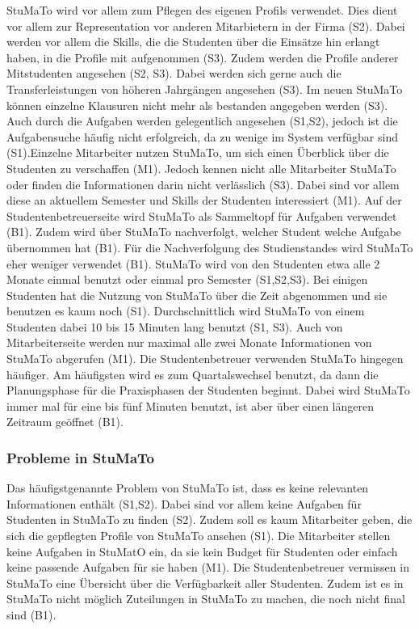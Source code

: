 \documentclass[
  12pt,
  ngerman,
  a4paper,
]{article}
\begin{document}
StuMaTo wird vor allem zum Pflegen des eigenen Profils verwendet. Dies
dient vor allem zur Representation vor anderen Mitarbietern in der Firma
(S2). Dabei werden vor allem die Skills, die die Studenten über die
Einsätze hin erlangt haben, in die Profile mit aufgenommen (S3). Zudem
werden die Profile anderer Mitstudenten angesehen (S2, S3). Dabei werden
sich gerne auch die Transferleistungen von höheren Jahrgängen angesehen
(S3). Im neuen StuMaTo können einzelne Klausuren nicht mehr als
bestanden angegeben werden (S3). Auch durch die Aufgaben werden
gelegentlich angesehen (S1,S2), jedoch ist die Aufgabensuche häufig
nicht erfolgreich, da zu wenige im System verfügbar sind (S1).Einzelne
Mitarbeiter nutzen StuMaTo, um sich einen Überblick über die Studenten
zu verschaffen (M1). Jedoch kennen nicht alle Mitarbeiter StuMaTo oder
finden die Informationen darin nicht verlässlich (S3). Dabei sind vor
allem diese an aktuellem Semester und Skills der Studenten interessiert
(M1). Auf der Studentenbetreuerseite wird StuMaTo als Sammeltopf für
Aufgaben verwendet (B1). Zudem wird über StuMaTo nachverfolgt, welcher
Student welche Aufgabe übernommen hat (B1). Für die Nachverfolgung des
Studienstandes wird StuMaTo eher weniger verwendet (B1). StuMaTo wird
von den Studenten etwa alle 2 Monate einmal benutzt oder einmal pro
Semester (S1,S2,S3). Bei einigen Studenten hat die Nutzung von StuMaTo
über die Zeit abgenommen und sie benutzen es kaum noch (S1).
Durchschnittlich wird StuMaTo von einem Studenten dabei 10 bis 15
Minuten lang benutzt (S1, S3). Auch von Mitarbeiterseite werden nur
maximal alle zwei Monate Informationen von StuMaTo abgerufen (M1). Die
Studentenbetreuer verwenden StuMaTo hingegen häufiger. Am häufigsten
wird es zum Quartalswechsel benutzt, da dann die Planungsphase für die
Praxisphasen der Studenten beginnt. Dabei wird StuMaTo immer mal für
eine bis fünf Minuten benutzt, ist aber über einen längeren Zeitraum
geöffnet (B1).

\hypertarget{probleme-in-stumato}{%
\subsubsection{Probleme in StuMaTo}\label{probleme-in-stumato}}

Das häufigstgenannte Problem von StuMaTo ist, dass es keine relevanten
Informationen enthält (S1,S2). Dabei sind vor allem keine Aufgaben für
Studenten in StuMaTo zu finden (S2). Zudem soll es kaum Mitarbeiter
geben, die sich die gepflegten Profile von StuMaTo ansehen (S1). Die
Mitarbeiter stellen keine Aufgaben in StuMatO ein, da sie kein Budget
für Studenten oder einfach keine passende Aufgaben für sie haben (M1).
Die Studentenbetreuer vermissen in StuMaTo eine Übersicht über die
Verfügbarkeit aller Studenten. Zudem ist es in StuMaTo nicht möglich
Zuteilungen in StuMaTo zu machen, die noch nicht final sind (B1).
\end{document}
